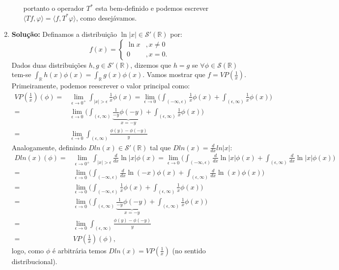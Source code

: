 \documentclass{article}
\begin{document}
\begin{enumerate}
\begin{enumerate}
$$				$$
				portanto o operador $T^{*}$ esta bem-definido e podemos escrever $\langle Tf, \varphi \rangle = \langle f, T^{*}\varphi \rangle $, como desejávamos.
			\end{enumerate}		
		\item \textbf{Solução:} Definamos a distribuição $\ln|x| \in \mathcal{S}'(\mathbb{R})$ por:
		$$
		f(x) = 
		\left\{
			\begin{array}{cc}
			\ln x & , x\neq 0 \\
			0 & , x =0.
			\end{array}		
		\right.
		$$
		Dados duas distribuições $h, g \in \mathcal{S}'(\mathbb{R})$, dizemos que $h = g$ se $\forall \phi \in \mathcal{S}(\mathbb{R})$ tem-se $\int_{\mathbb{R}}h(x)\phi(x) = \int_{\mathbb{R}}g(x)\phi(x)$. Vamos mostrar que $f = VP(\frac{1}{x})$. Primeiramente, podemos reescrever o valor principal como:
		$$
		\begin{aligned}
			VP(\frac{1}{x})(\phi) = & \lim_{\epsilon \to 0^{+}} \int_{|x|>\epsilon} \frac{1}{x}\phi(x) = \lim_{\epsilon \to 0} \Big( \int_{(-\infty, \epsilon)} \frac{1}{x}\phi(x) + \int_{(\epsilon, \infty)}  \frac{1}{x}\phi(x) \Big)
			\\
			= & \lim_{\epsilon \to 0} \Big( \int_{(\epsilon, \infty)} \underbrace{ \frac{1}{-y}\phi(-y) }_{x = -y} + \int_{(\epsilon, \infty)} \frac{1}{x}\phi(x) \Big)
			\\
			= & \lim_{\epsilon \to 0} \int_{(\epsilon, \infty)}  \frac{\phi(y)-\phi(-y)}{y}
		\end{aligned}
	 	$$
	 	Analogamente, definindo $Dln(x) \in \mathcal{S}'(\mathbb{R})$ tal que $Dln(x) = \frac{d}{dx}ln|x|$:
		$$
		\begin{aligned}
			Dln(x)(\phi) = & \lim_{\epsilon \to 0^{+}} \int_{|x|>\epsilon} \frac{d}{dx}\ln|x| \phi(x) = \lim_{\epsilon \to 0} \Big( \int_{(-\infty, \epsilon)} \frac{d}{dx}\ln|x| \phi(x) + \int_{(\epsilon, \infty)} \frac{d}{dx}\ln|x| \phi(x) \Big)
			\\
			= & \lim_{\epsilon \to 0} \Big( \int_{(-\infty, \epsilon)} \frac{d}{dx}\ln(-x) \phi(x) + \int_{(\epsilon, \infty)} \frac{d}{dx}\ln (x) \phi(x) \Big)
			\\
			= & \lim_{\epsilon \to 0} \Big( \int_{(-\infty, \epsilon)} \frac{1}{x} \phi(x) + \int_{(\epsilon, \infty)} \frac{1}{x} \phi(x) \Big)
			\\
			= & \lim_{\epsilon \to 0} \Big( \int_{(\epsilon, \infty)} \underbrace{ \frac{1}{-y} \phi(-y) }_{x=-y} + \int_{(\epsilon, \infty)} \frac{1}{x} \phi(x) \Big)
			\\
			= & \lim_{\epsilon \to 0} \int_{(\epsilon, \infty)}  \frac{\phi(y)-\phi(-y)}{y}
			\\
			= & VP(\frac{1}{x})(\phi),
		\end{aligned}
		$$
		logo, como $\phi$ é arbitrária temos $Dln(x) = VP(\frac{1}{x})$ (no sentido distribucional).  
		

\end{enumerate}
\end{document}
